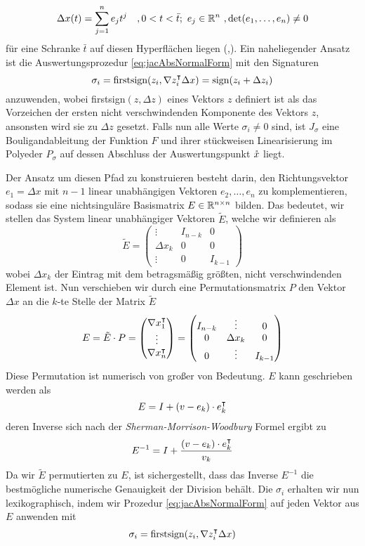 \begin{equation}
 \Delta x(t) = \sum_{j=1}^n e_j t^j \quad ,0<t<\bar t;~e_j\in \mathbb{R}^n ~,\det(e_1,\ldots,e_n)\neq 0
\end{equation}
für eine Schranke $\bar t$ auf diesen Hyperflächen liegen (\cite[Proposition 6]{monster},\cite[S.11]{plan}). 
Ein naheliegender Ansatz ist die Auswertungsprozedur \eqref{eq:jacAbsNormalForm} mit den Signaturen
\[
 \sigma_i = \text{firstsign}(z_i,\nabla z_i^\intercal\Delta x) = \text{sign}(z_i+\Delta z_i)
\]
anzuwenden, wobei firstsign$(z,\Delta z)$ eines Vektors $z$ definiert ist als das Vorzeichen der ersten nicht verschwindenden Komponente des Vektors $z$, ansonsten wird sie zu $\Delta z$ gesetzt. Falls nun alle Werte $\sigma_i \neq 0$ sind, ist $J_\sigma$ eine Bouligandableitung der Funktion $F$ und ihrer stückweisen Linearisierung im Polyeder $P_\sigma$ auf dessen Abschluss der Auswertungspunkt $\mathring{x}$ liegt.

Der Ansatz um diesen Pfad zu konstruieren besteht darin, den Richtungsvektor $e_1 = \Delta x$ mit $n-1$ linear unabhängigen Vektoren $e_2,\ldots, e_n$ zu komplementieren, sodass sie eine nichtsinguläre Basismatrix $E\in \mathbb{R}^{n\times n}$ bilden.
Das bedeutet, wir stellen das System linear unabhängiger Vektoren $\tilde E$, welche wir definieren als
\[
\tilde E = 
 \begin{pmatrix}
  \vdots   & I_{n-k} & 0 \\
  \Delta x_k & 0&0\\
  \vdots   & 0&I_{k-1}
 \end{pmatrix}
\]
wobei $\Delta x_k$ der Eintrag mit dem betragsmäßig größten, nicht verschwindenden Element ist. Nun verschieben wir durch eine Permutationsmatrix $P$ den Vektor $\Delta x$ an die $k$-te Stelle der Matrix $\tilde E$
\[
E = \tilde E \cdot P=
\begin{pmatrix}
  \nabla x_1^\intercal\\
  \vdots\\
  \nabla x_n^\intercal\\
 \end{pmatrix}
 =
  \begin{pmatrix}
   I_{n-k} & \vdots &0\\
  0 & \Delta x_k & 0\\
    0 & \vdots&I_{k-1}
 \end{pmatrix}
\]
Diese Permutation ist numerisch von großer von Bedeutung. $E$ kann geschrieben werden als
\[
  E = I + (v-e_k)\cdot e_k^\intercal 
\] 
deren Inverse sich nach der \textit{Sherman-Morrison-Woodbury} Formel ergibt zu
\[
 E^{-1} = I + \frac{(v-e_k)\cdot e_k^\intercal}{v_k}
\]
Da wir $\tilde E$ permutierten zu $E$, ist sichergestellt, dass das Inverse $E^{-1}$ die bestmögliche numerische Genauigkeit der Division behält.
Die $\sigma_i$ erhalten wir nun lexikographisch, indem wir Prozedur \eqref{eq:jacAbsNormalForm} auf jeden Vektor aus $E$ anwenden mit 
\[
  \sigma_i = \text{firstsign}(z_i,\nabla z_i^\intercal\Delta x)
\]

